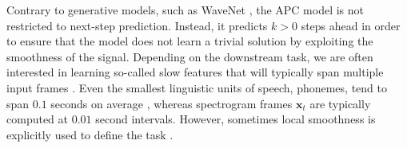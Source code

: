 Contrary to generative models, such as WaveNet \cite{oord_wavenet:_2016}, the APC model is not restricted to next-step prediction. Instead, it predicts $k > 0$ steps ahead in order to ensure that the model does not learn a trivial solution by exploiting the smoothness of the signal. Depending on the downstream task, we are often interested in learning so-called slow features that will typically span multiple input frames \cite{wiskott2002slow}. Even the smallest linguistic units of speech, phonemes, tend to span $0.1$ seconds on average \cite{garofolo_timit_1993}, whereas spectrogram frames $\mathbf{x}_t$ are typically computed at $0.01$ second intervals. However, sometimes local smoothness is explicitly used to define the task \cite{badino2014auto, jati2017speaker2vec, jati2019neural}.





